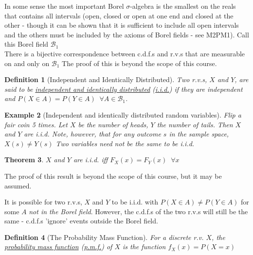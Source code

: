 \documentclass[12pt,a4paper]{article}
\newtheorem{thm}{Theorem}[subsection]
\newtheorem{defn}[thm]{Definition}
\newtheorem{ex}[thm]{Example}
\begin{document}
In some sense the most important Borel $\sigma$-algebra is the smallest on the reals that contains all intervals (open, closed or open at one end and closed at the other - though it can be shown that it is sufficient to include all open intervals and the others must be included by the axioms of Borel fields - see M2PM1). Call this Borel field $\mathcal{B}_1$\\
\indent There is a bijective correspondence between c.d.f.s and r.v.s that are measurable on and only on $\mathcal{B}_1$ The proof of this is beyond the scope of this course.

\begin{defn}[Independent and Identically Distributed]
\vspace{1cm}

Two r.v.s, $X$ and $Y$, are said to be \underline{independent and identically distributed} (\underline{i.i.d.}) if they are independent and $P(X \in A) = P(Y \in A)\;\;\forall A \in \mathcal{B}_1$.
\end{defn}

\begin{ex}[Independent and identically distributed random variables]
\vspace{1cm}

Flip a fair coin 5 times. Let $X$ be the number of heads, $Y$ the number of tails. Then $X$ and $Y$ are i.i.d. Note, however, that for any outcome $s$ in the sample space, $X(s) \neq Y(s)$ Two variables need not be the same to be i.i.d.
\end{ex}

\begin{thm}
\vspace{1cm}

$X$ and $Y$ are i.i.d. iff $F_X(x) = F_Y(x) \;\;\forall x$
\end{thm}

\noindent The proof of this result is beyond the scope of this course, but it may be assumed.\par
\vspace{1cm}
\indent It is possible for two r.v.s, $X$ and $Y$ to be i.i.d. with $P(X \in A) \neq P(Y \in A)$ for some $A$ {\it not in the Borel field}. However, the c.d.f.s of the two r.v.s will still be the same - c.d.f.s 'ignore' events outside the Borel field.

\begin{defn}[The Probability Mass Function]
\vspace{1cm}

For a discrete r.v. $X$, the \underline{probability mass function} (\underline{p.m.f.}) of $X$ is the function $f_X(x) = P(X = x)$
\end{defn}
\end{document}
